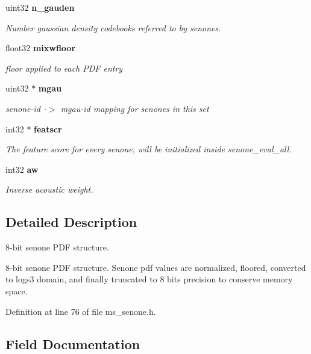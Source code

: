 \begin{DoxyCompactItemize}
\mbox{\label{structsenone__t_a71cf7b41b2334216944380296c03c99a}} 
uint32 \textbf{ n\+\_\+gauden}
\begin{DoxyCompactList}\small\item\em Number gaussian density codebooks referred to by senones. \end{DoxyCompactList}\item 
\mbox{\label{structsenone__t_af3f77493f07dd1740084ea8dc4541cb1}} 
float32 \textbf{ mixwfloor}
\begin{DoxyCompactList}\small\item\em floor applied to each P\+DF entry \end{DoxyCompactList}\item 
\mbox{\label{structsenone__t_a5f0eee5a11e7c10b20e0cce10305edfc}} 
uint32 $\ast$ \textbf{ mgau}
\begin{DoxyCompactList}\small\item\em senone-\/id -\/$>$ mgau-\/id mapping for senones in this set \end{DoxyCompactList}\item 
\mbox{\label{structsenone__t_a58af20c262d9d633f53c8c1c7e60459e}} 
int32 $\ast$ \textbf{ featscr}
\begin{DoxyCompactList}\small\item\em The feature score for every senone, will be initialized inside senone\+\_\+eval\+\_\+all. \end{DoxyCompactList}\item 
\mbox{\label{structsenone__t_ad9b17f6aecf056fcea0eaaab0c7d35ca}} 
int32 \textbf{ aw}
\begin{DoxyCompactList}\small\item\em Inverse acoustic weight. \end{DoxyCompactList}\end{DoxyCompactItemize}


\subsection{Detailed Description}
8-\/bit senone P\+DF structure. 

8-\/bit senone P\+DF structure. Senone pdf values are normalized, floored, converted to logs3 domain, and finally truncated to 8 bits precision to conserve memory space. 

Definition at line 76 of file ms\+\_\+senone.\+h.



\subsection{Field Documentation}
\mbox{\label{structsenone__t_aa7e23dc8a18875bad1c1b9c322f3cad4}} 
